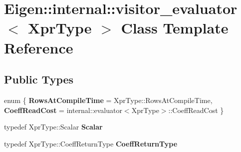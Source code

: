 \hypertarget{class_eigen_1_1internal_1_1visitor__evaluator}{}\section{Eigen\+::internal\+::visitor\+\_\+evaluator$<$ Xpr\+Type $>$ Class Template Reference}
\label{class_eigen_1_1internal_1_1visitor__evaluator}
\subsection*{Public Types}
\begin{DoxyCompactItemize}
\item 
\mbox{\label{class_eigen_1_1internal_1_1visitor__evaluator_ab450ed675aa77a3aa17bd70a62d50daa}} 
enum \{ {\bfseries Rows\+At\+Compile\+Time} = Xpr\+Type\+::Rows\+At\+Compile\+Time, 
{\bfseries Coeff\+Read\+Cost} = internal\+::evaluator$<$Xpr\+Type$>$\+::Coeff\+Read\+Cost
 \}
\item 
\mbox{\label{class_eigen_1_1internal_1_1visitor__evaluator_a338f2c6066ef18790ed4c56e9c34fada}} 
typedef Xpr\+Type\+::\+Scalar {\bfseries Scalar}
\item 
\mbox{\label{class_eigen_1_1internal_1_1visitor__evaluator_aefc76b27156b43a28b3075d81a33d4fb}} 
typedef Xpr\+Type\+::\+Coeff\+Return\+Type {\bfseries Coeff\+Return\+Type}
\end{DoxyCompactItemize}
